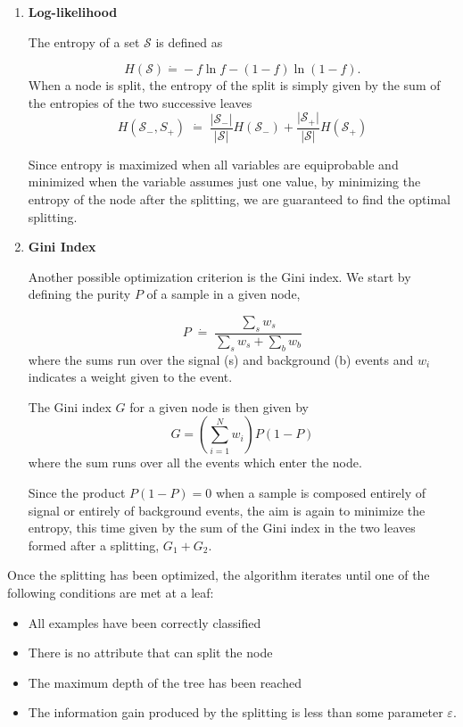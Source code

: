 \documentclass[10pt,a4paper]{book}
\begin{document}
\begin{enumerate}

\item \textbf{Log-likelihood}

The entropy of a set $\mathcal{S}$ is defined as

\begin{equation}
H(\mathcal{S}) \dot{=} -f\ln f - (1 - f)\ln (1-f).
\end{equation}
When a node is split, the entropy of the split is simply given by the sum of the entropies of the two successive leaves
\begin{equation}
H(\mathcal{S}_{-}, S_+) \; \dot{=} \;\frac{\vert \mathcal{S}_{-}\vert }{\vert \mathcal{S}\vert}H(\mathcal{S}_{-}) +\frac{\vert \mathcal{S}_{+}\vert }{\vert \mathcal{S}\vert}H(\mathcal{S}_{+})
\end{equation}

Since entropy is maximized when all variables are equiprobable and minimized when the variable assumes just one value, by minimizing the entropy of the node after the splitting, we are guaranteed to find the optimal splitting.

\item \textbf{Gini Index}

Another possible optimization criterion is the Gini index. We start by defining the purity $P$ of a sample in a given node,

\begin{equation}
P \; \dot{=} \; \frac{\sum_s w_s}{\sum_s w_s + \sum_b w_b}
\end{equation}
where the sums run over the signal (s) and background (b) events and $w_i$ indicates a weight given to the event. 

The Gini index $G$ for a given node is then given by 
\begin{equation}
G = \left(\sum_{i = 1}^N w_i \right) P(1-P)
\end{equation}
where the sum runs over all the events which enter the node.

Since the product $P(1-P) = 0$ when a sample is composed entirely of signal or entirely of background events, the aim is again to minimize the entropy, this time given by the sum of the Gini index in the two leaves formed after a splitting, $G_1 + G_2$.
\end{enumerate}

Once the splitting has been optimized, the algorithm iterates until one of the following conditions are met at a leaf:
\begin{itemize}
\item All examples have been correctly classified
\item There is no attribute that can split the node
\item The maximum depth of the tree has been reached
\item The information gain produced by the splitting is less than some parameter $\varepsilon$.
\end{itemize}
\end{document}
